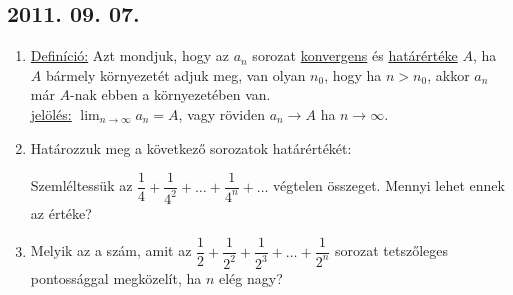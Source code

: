 \subsection*{2011. 09. 07.}
\begin{enumerate}
\item \underline{Definíció:} Azt mondjuk, hogy az $a_n$ sorozat \underline{konvergens} és \underline{határértéke} $A$, ha $A$ bármely környezetét adjuk meg, van olyan $n_0$, hogy ha $n>n_0$, akkor $a_n$ már $A$-nak ebben a környezetében van.
\\
\underline{jelölés:} $\displaystyle\lim_{n \to \infty} a_n=A$, vagy röviden $a_n \to A$ ha $n \to \infty$.

\item Határozzuk meg a következő sorozatok határértékét:

Szemléltessük az
	$\dfrac{1}{4}+\dfrac{1}{4^2}+\ldots+\dfrac{1}{4^n}+\ldots$
	végtelen összeget. Mennyi lehet ennek az értéke?

\item Melyik az a szám, amit az
   $\dfrac{1}{2}+\dfrac{1}{2^2}+\dfrac{1}{2^3}+\ldots+\dfrac{1}{2^n}$
   sorozat tetszőleges pontossággal megközelít, ha $n$ elég nagy?

\end{enumerate}

